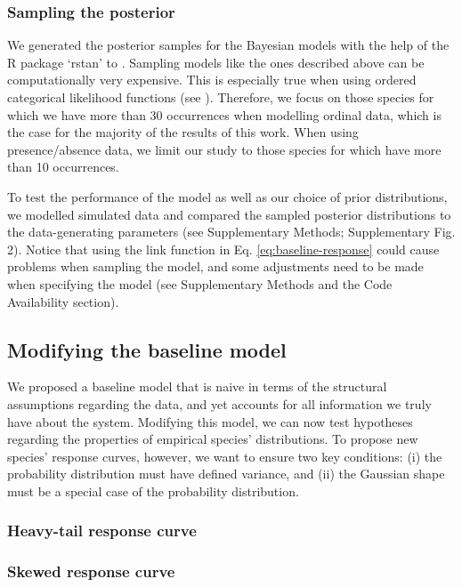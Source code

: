 \documentclass[11pt, a4paper]{article}
\begin{document}
\subsubsection*{Sampling the posterior}
We generated the posterior samples for the Bayesian models with the help of the R package `rstan' to \citep{standevelopentteamRStanInterfaceStan2021}. Sampling models like the ones described above can be computationally very expensive. This is especially true when using ordered categorical likelihood functions (see \citealt{standevelopmentteamStanModelingLanguage2021}). Therefore, we focus on those species for which we have more than 30 occurrences when modelling ordinal data, which is the case for the majority of the results of this work. When using presence/absence data, we limit our study to those species for which have more than 10 occurrences. 

To test the performance of the model as well as our choice of prior distributions, we modelled simulated data and compared the sampled posterior distributions to the data-generating parameters (see Supplementary Methods; Supplementary Fig. 2). Notice that using the link function in Eq. \ref{eq:baseline-response} could cause problems when sampling the model, and some adjustments need to be made when specifying the model (see Supplementary Methods and the Code Availability section). 

\subsection*{Modifying the baseline model}
We proposed a baseline model that is naive in terms of the structural assumptions regarding the data, and yet accounts for all information we truly have about the system. Modifying this model, we can now test hypotheses regarding the properties of empirical species' distributions. To propose new species' response curves, however, we want to ensure two key conditions: (i) the probability distribution must have defined variance, and (ii) the Gaussian shape must be a special case of the probability distribution.

\subsubsection*{Heavy-tail response curve}

\subsubsection*{Skewed response curve}
\end{document}
